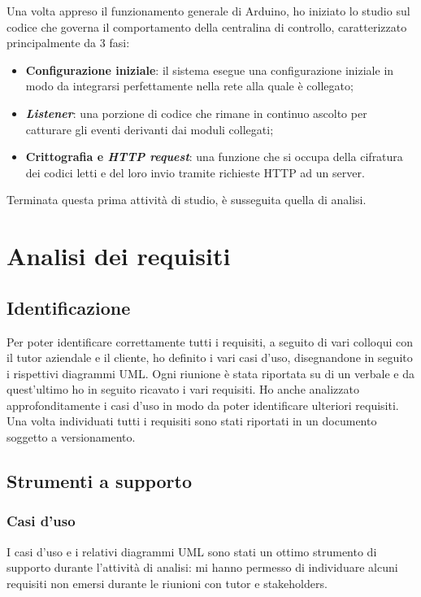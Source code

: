 Una volta appreso il funzionamento generale di Arduino, ho iniziato lo studio sul codice che governa il comportamento della centralina di controllo, caratterizzato principalmente da 3 fasi:

\begin{itemize}
\item \textbf{Configurazione iniziale}: il sistema esegue una configurazione iniziale in modo da integrarsi perfettamente nella rete alla quale è collegato;
\item \textbf{\textit{Listener}}: una porzione di codice che rimane in continuo ascolto per catturare gli eventi derivanti dai moduli collegati;
\item \textbf{Crittografia e \textit{HTTP request}}: una funzione che si occupa della cifratura dei codici letti e del loro invio tramite richieste HTTP ad un server.
\end{itemize}

Terminata questa prima attività di studio, è susseguita quella di analisi.

\section{Analisi dei requisiti}
\subsection{Identificazione}
Per poter identificare correttamente tutti i requisiti, a seguito di vari colloqui con il tutor aziendale e il cliente, ho definito i vari casi d'uso, disegnandone in seguito i rispettivi diagrammi UML. Ogni riunione è stata riportata su di un verbale e da quest'ultimo ho in seguito ricavato i vari requisiti. Ho anche analizzato approfonditamente i casi d'uso in modo da poter identificare ulteriori requisiti. Una volta individuati tutti i requisiti sono stati riportati in un documento soggetto a versionamento.

\subsection{Strumenti a supporto}
\subsubsection{Casi d'uso}
I casi d'uso e i relativi diagrammi UML sono stati un ottimo strumento di supporto durante l'attività di analisi: mi hanno permesso di individuare alcuni requisiti non emersi durante le riunioni con tutor e stakeholders.

